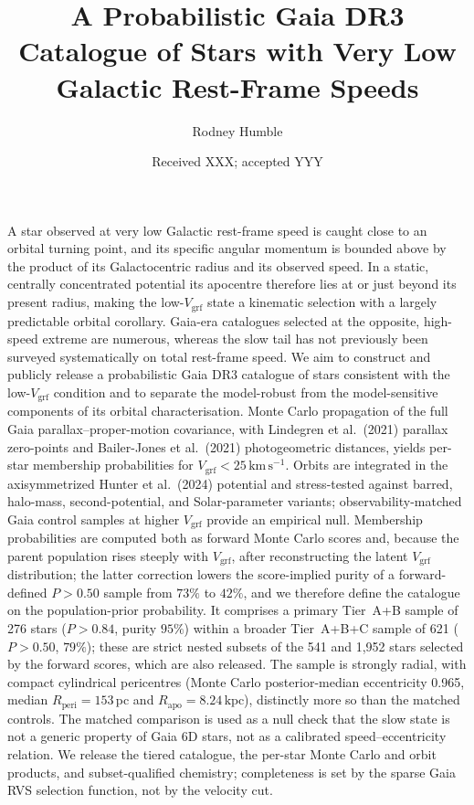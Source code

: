 \documentclass{aa}  %
\newcommand{\vgrf}{\ensuremath{V_{\mathrm{grf}}}\xspace}
\newcommand{\kms}{\ensuremath{\,\mathrm{km\,s^{-1}}}\xspace}
\newcommand{\kpc}{\ensuremath{\,\mathrm{kpc}}\xspace}
\newcommand{\Rperi}{R_{\mathrm{peri}}}
\newcommand{\Rapo}{R_{\mathrm{apo}}}
\begin{document}
\title{A Probabilistic Gaia DR3 Catalogue of Stars with Very Low Galactic Rest-Frame Speeds}

\author{Rodney Humble}

\date{Received XXX; accepted YYY}

\abstract
{A star observed at very low Galactic rest-frame speed is caught close to
an orbital turning point, and its specific angular momentum is bounded
above by the product of its Galactocentric radius and its observed speed.
In a static, centrally concentrated potential its apocentre therefore lies
at or just beyond its present radius, making the low-\vgrf{} state a
kinematic selection with a largely predictable orbital corollary.  Gaia-era
catalogues selected at the opposite, high-speed extreme are numerous,
whereas the slow tail has not previously been surveyed systematically on
total rest-frame speed.}
{We aim to construct and publicly release a probabilistic Gaia DR3
catalogue of stars consistent with the low-\vgrf{} condition and to
separate the model-robust from the model-sensitive components of its
orbital characterisation.}
{Monte Carlo propagation of the full Gaia parallax--proper-motion
covariance, with Lindegren et al.\ (2021) parallax zero-points and
Bailer-Jones et al.\ (2021) photogeometric distances, yields per-star
membership probabilities for $\vgrf<25\kms$.  Orbits are integrated in
the axisymmetrized Hunter et al.\ (2024) potential and stress-tested
against barred, halo-mass, second-potential, and Solar-parameter
variants; observability-matched Gaia control samples at higher \vgrf{}
provide an empirical null.}
{Membership probabilities are computed both as forward Monte Carlo scores
and, because the parent population rises steeply with \vgrf{}, after
reconstructing the latent \vgrf{} distribution; the latter correction
lowers the score-implied purity of a forward-defined $P>0.50$ sample from
$73\%$ to $42\%$, and we therefore define the catalogue on the
population-prior probability.  It comprises a primary Tier~A+B sample of
276 stars ($P>0.84$, purity $95\%$) within a broader Tier~A+B+C sample of
621 ($P>0.50$, $79\%$); these are strict nested subsets of the 541 and
1{,}952 stars selected by the forward scores, which are also released.
The sample is strongly radial, with compact cylindrical pericentres
(Monte Carlo posterior-median eccentricity 0.965, median $\Rperi=153$\,pc
and $\Rapo=8.24$\kpc), distinctly more so than the
matched controls.  The matched comparison is used as a null check that
the slow state is not a generic property of Gaia 6D stars, not as a
calibrated speed--eccentricity relation.}
{We release the tiered catalogue, the per-star Monte Carlo and orbit
products, and subset-qualified chemistry; completeness is set by the
sparse Gaia RVS selection function, not by the velocity cut.}
\end{document}
